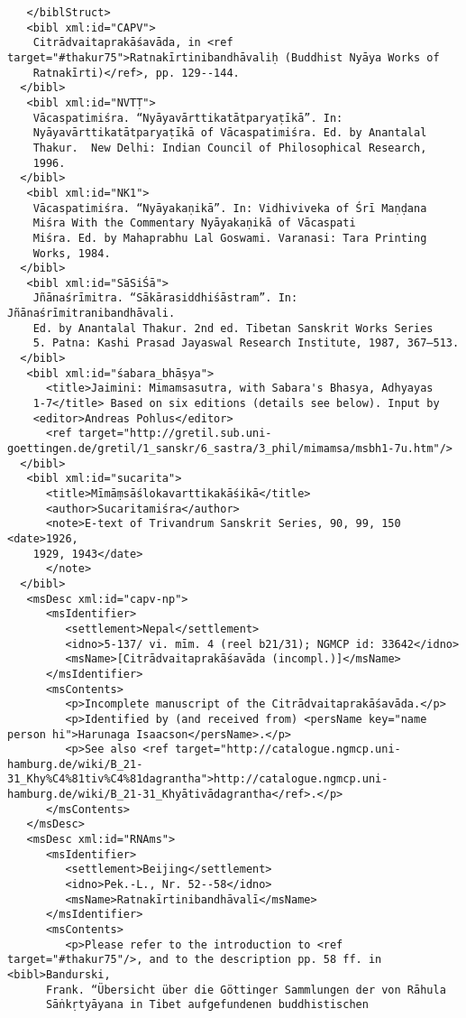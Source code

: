\documentclass[article,12pt,a4paper]{memoir}
\begin{document}
\begin{verbatim}
   </biblStruct>
   <bibl xml:id="CAPV">
    Citrādvaitaprakāśavāda, in <ref target="#thakur75">Ratnakīrtinibandhāvaliḥ (Buddhist Nyāya Works of
    Ratnakīrti)</ref>, pp. 129--144.
  </bibl>
   <bibl xml:id="NVTṬ">
    Vācaspatimiśra. “Nyāyavārttikatātparyaṭīkā”. In:
    Nyāyavārttikatātparyaṭīkā of Vācaspatimiśra. Ed. by Anantalal
    Thakur.  New Delhi: Indian Council of Philosophical Research,
    1996.
  </bibl>
   <bibl xml:id="NK1">
    Vācaspatimiśra. “Nyāyakaṇikā”. In: Vidhiviveka of Śrī Maṇḍana
    Miśra With the Commentary Nyāyakaṇikā of Vācaspati
    Miśra. Ed. by Mahaprabhu Lal Goswami. Varanasi: Tara Printing
    Works, 1984.
  </bibl>
   <bibl xml:id="SāSiŚā">
    Jñānaśrīmitra. “Sākārasiddhiśāstram”. In: Jñānaśrīmitranibandhāvali.
    Ed. by Anantalal Thakur. 2nd ed. Tibetan Sanskrit Works Series
    5. Patna: Kashi Prasad Jayaswal Research Institute, 1987, 367–513.
  </bibl>
   <bibl xml:id="śabara_bhāṣya">
      <title>Jaimini: Mimamsasutra, with Sabara's Bhasya, Adhyayas
    1-7</title> Based on six editions (details see below). Input by
    <editor>Andreas Pohlus</editor>
      <ref target="http://gretil.sub.uni-goettingen.de/gretil/1_sanskr/6_sastra/3_phil/mimamsa/msbh1-7u.htm"/>
  </bibl>
   <bibl xml:id="sucarita">
      <title>Mīmāṃsāślokavarttikakāśikā</title>
      <author>Sucaritamiśra</author>
      <note>E-text of Trivandrum Sanskrit Series, 90, 99, 150 <date>1926,
    1929, 1943</date>
      </note>  
  </bibl>
   <msDesc xml:id="capv-np">
      <msIdentifier>
         <settlement>Nepal</settlement>
         <idno>5-137/ vi. mīm. 4 (reel b21/31); NGMCP id: 33642</idno>
         <msName>[Citrādvaitaprakāśavāda (incompl.)]</msName>
      </msIdentifier>
      <msContents>
         <p>Incomplete manuscript of the Citrādvaitaprakāśavāda.</p>
         <p>Identified by (and received from) <persName key="name person hi">Harunaga Isaacson</persName>.</p>
         <p>See also <ref target="http://catalogue.ngmcp.uni-hamburg.de/wiki/B_21-31_Khy%C4%81tiv%C4%81dagrantha">http://catalogue.ngmcp.uni-hamburg.de/wiki/B_21-31_Khyātivādagrantha</ref>.</p>
      </msContents>
   </msDesc>
   <msDesc xml:id="RNAms">
      <msIdentifier>
         <settlement>Beijing</settlement>
         <idno>Pek.-L., Nr. 52--58</idno>
         <msName>Ratnakīrtinibandhāvalī</msName>
      </msIdentifier>
      <msContents>
         <p>Please refer to the introduction to <ref target="#thakur75"/>, and to the description pp. 58 ff. in <bibl>Bandurski,
      Frank. “Übersicht über die Göttinger Sammlungen der von Rāhula
      Sāṅkṛtyāyana in Tibet aufgefundenen buddhistischen

\end{verbatim}
\end{document}

